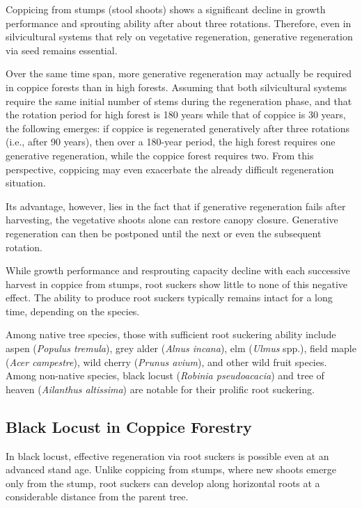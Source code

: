 Coppicing from stumps (stool shoots) shows a significant decline in growth performance and sprouting ability after about three rotations. Therefore, even in silvicultural systems that rely on vegetative regeneration, generative regeneration via seed remains essential.

Over the same time span, more generative regeneration may actually be required in coppice forests than in high forests. Assuming that both silvicultural systems require the same initial number of stems during the regeneration phase, and that the rotation period for high forest is 180 years while that of coppice is 30 years, the following emerges: if coppice is regenerated generatively after three rotations (i.e., after 90 years), then over a 180-year period, the high forest requires one generative regeneration, while the coppice forest requires two. From this perspective, coppicing may even exacerbate the already difficult regeneration situation.

Its advantage, however, lies in the fact that if generative regeneration fails after harvesting, the vegetative shoots alone can restore canopy closure. Generative regeneration can then be postponed until the next or even the subsequent rotation.

While growth performance and resprouting capacity decline with each successive harvest in coppice from stumps, root suckers show little to none of this negative effect. The ability to produce root suckers typically remains intact for a long time, depending on the species.

Among native tree species, those with sufficient root suckering ability include aspen (\emph{Populus tremula}), grey alder (\emph{Alnus incana}), elm (\emph{Ulmus} spp.), field maple (\emph{Acer campestre}), wild cherry (\emph{Prunus avium}), and other wild fruit species. Among non-native species, black locust (\emph{Robinia pseudoacacia}) and tree of heaven (\emph{Ailanthus altissima}) are notable for their prolific root suckering.

\subsection{Black Locust in Coppice Forestry}

In black locust, effective regeneration via root suckers is possible even at an advanced stand age. Unlike coppicing from stumps, where new shoots emerge only from the stump, root suckers can develop along horizontal roots at a considerable distance from the parent tree.

